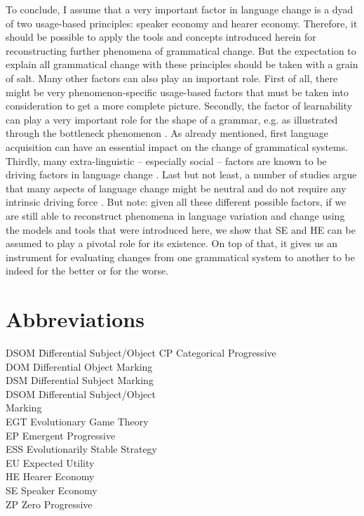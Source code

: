 \documentclass[output=paper,hidelinks]{langscibook}
\begin{document}
To conclude, I assume that a very important factor in language change is a dyad of two usage-based principles: speaker economy and hearer economy. Therefore, it should be possible to apply the tools and concepts introduced herein for reconstructing further phenomena of grammatical change. But the expectation to explain all grammatical change with these principles should be taken with a grain of salt. Many other factors can also play an important role. First of all, there might be very phenomenon-specific usage-based factors that must be taken into consideration to get a more complete picture. Secondly, the factor of learnability can play a very important role for the shape of a grammar, e.g. as illustrated through the bottleneck phenomenon \citep[cf.][]{Kirby_2002}. As already mentioned, first language acquisition can have an essential impact on the change of grammatical systems. Thirdly, many extra-linguistic -- especially social -- factors are known to be driving factors in language change \citep[cf.][]{Croft2000,Labov01}. Last but not least, a number of studies argue that many aspects of language change might be neutral and do not require any intrinsic driving force \citep[cf.][]{Blythe_2012,Stadler_2016,Newberry_2017,Kauhanen_2017}. But note: given all these different possible factors, if we are still able to reconstruct phenomena in language variation and change using the models and tools that were introduced here, we show that SE and HE can be assumed to play a pivotal role for its existence. On top of that, it gives us an instrument for evaluating changes from one grammatical system to another to be indeed for the better or for the worse.


\section*{Abbreviations}
\begin{multicols}{2}
\begin{tabbing}
{DSOM} \= Differential Subject/Object\kill
{CP}   \> Categorical Progressive\\
{DOM}  \> Differential Object Marking\\
{DSM}  \> Differential Subject Marking\\
{DSOM} \> Differential Subject/Object \\ \> Marking\\
{EGT}  \> Evolutionary Game Theory\\ 
{EP}   \> Emergent Progressive\\
{ESS}  \> Evolutionarily Stable Strategy\\
{EU}   \> Expected Utility\\ 
{HE}   \> Hearer Economy\\ 
{SE}   \> Speaker Economy\\ 
{ZP}   \> Zero Progressive
\end{tabbing}
\end{multicols}
\end{document}
